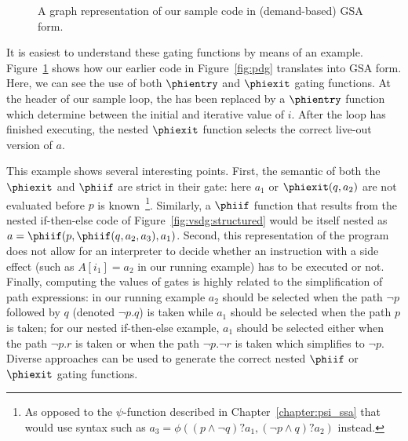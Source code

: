 \begin{figure}
\centering
{}
\caption{A graph representation of our sample code in (demand-based) GSA form.}
\label{fig:gsa-graph-example}
\end{figure}

It is easiest to understand these gating functions by means of an example. 
Figure~\ref{fig:gsa-graph-example} shows how our earlier code in Figure~\ref{fig:pdg} translates into GSA form. 
Here, we can see the use of both $\phientry$ and $\phiexit$ gating functions. 
At the header of our sample loop, the \phifun has been replaced by a $\phientry$ function which determine between the initial and iterative value of $i$. 
After the loop has finished executing, the nested $\phiexit$ function selects the correct live-out version of $a$.

This example shows several interesting points. 
First, the semantic of both the $\phiexit$ and $\phiif$ are strict in their gate: 
here $a_1$ or $\phiexit(q,a_2)$ are not evaluated before $p$ is known~\footnote{As opposed to the $\psi$-function described in Chapter~\ref{chapter:psi_ssa} that would use syntax such as $a_3=\phi((p\wedge \lnot q)?a_1, (\lnot p\wedge q)?a_2)$ instead.}. 
Similarly, a $\phiif$ function that results from the nested if-then-else code of Figure~\ref{fig:vsdg:structured} would be itself nested as $a=\phiif(p,\phiif(q,a_2,a_3),a_1)$. 
Second, this representation of the program does not allow for an interpreter to decide whether an instruction with a side effect (such as $A[i_1]=a_2$ in our running example) has to be executed or not. 
Finally, computing the values of gates is highly related to the simplification of path expressions: 
in our running example $a_2$ should be selected when the path $\lnot p$ followed by $q$ (denoted $\lnot p . 
q$) is taken while $a_1$ should be selected when the path $p$ is taken; 
for our nested if-then-else example, $a_1$ should be selected either when the path $\lnot p . 
r$ is taken or when the path $\lnot p . 
\lnot r$ is taken which simplifies to $\lnot p$. 
Diverse approaches can be used to generate the correct nested $\phiif$ or $\phiexit$ gating functions.

